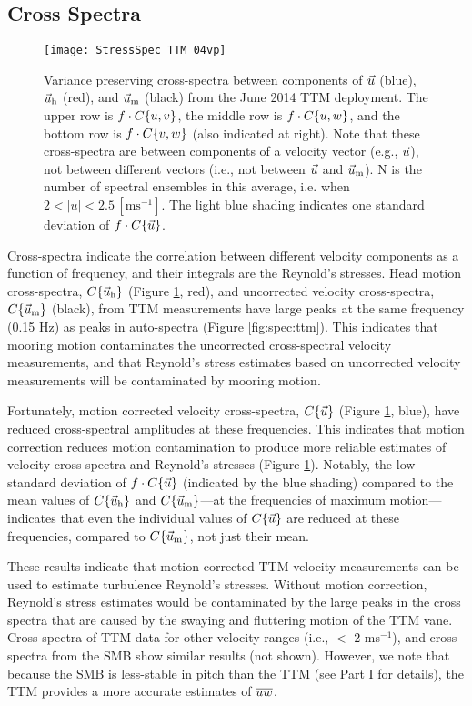 \subsection{Cross Spectra}

\begin{figure}[t]
  \centering
  \texttt{[image: StressSpec\_TTM\_04vp]}
  \caption{Variance preserving cross-spectra between components of $\vec{u}$ (blue), $\vec{u}_{\mathrm{h}}$ (red), and $\vec{u}_{\mathrm{m}}$ (black) from the June 2014 TTM deployment. The upper row is $f \cdot C\{u,v\}$, the middle row is $f \cdot C\{u,w\}$, and the bottom row is $f \cdot C\{v,w\}$ (also indicated at right).  Note that these cross-spectra are between components of a velocity vector (e.g., $\vec{u}$), not between different vectors (i.e., not between $\vec{u}$ and $\vec{u}_{\mathrm{m}}$). N is the number of spectral ensembles in this average, i.e. when $2 < |u| < 2.5\,\mathrm{[ms^{-1}]}$. The light blue shading indicates one standard deviation of $f \cdot C\{\vec{u}\}$.}
  \label{fig:cspec:ttm}
\end{figure}

Cross-spectra indicate the correlation between different velocity components as a function of frequency, and their integrals are the Reynold's stresses. Head motion cross-spectra, $C\{\vec{u}_{\mathrm{h}}\}$ (Figure \ref{fig:cspec:ttm}, red), and uncorrected velocity cross-spectra, $C\lbrace \vec{u}_{\mathrm{m}} \rbrace$ (black), from TTM measurements have large peaks at the same frequency (0.15 Hz) as peaks in auto-spectra (Figure \ref{fig:spec:ttm}).  This indicates that mooring motion contaminates the uncorrected cross-spectral velocity measurements, and that Reynold's stress estimates based on uncorrected velocity measurements will be contaminated by mooring motion. 

Fortunately, motion corrected velocity cross-spectra, $C\{\vec{u}\}$ (Figure \ref{fig:cspec:ttm}, blue), have reduced cross-spectral amplitudes at these frequencies. This indicates that motion correction reduces motion contamination to produce more reliable estimates of velocity cross spectra and Reynold's stresses (Figure \ref{fig:cspec:ttm}). Notably, the low standard deviation of $f\cdot C\{\vec{u}\}$ (indicated by the blue shading) compared to the mean values of $C\{\vec{u}_{\mathrm{h}}\}$ and $C\{\vec{u}_{\mathrm{m}}\}$---at the frequencies of maximum motion---indicates that even the individual values of $C\{\vec{u}\}$ are reduced at these frequencies, compared to $C\{\vec{u}_{\mathrm{m}}\}$, not just their mean.

These results indicate that motion-corrected TTM velocity measurements can be used to estimate turbulence Reynold's stresses. Without motion correction, Reynold's stress estimates would be contaminated by the large peaks in the cross spectra that are caused by the swaying and fluttering motion of the TTM vane. Cross-spectra of TTM data for other velocity ranges (i.e., $<$ 2 ms$^{-1}$), and cross-spectra from the SMB show similar results (not shown). However, we note that because the SMB is less-stable in pitch than the TTM (see Part I for details), the TTM provides a more accurate estimates of  $\overline{uw}$.

